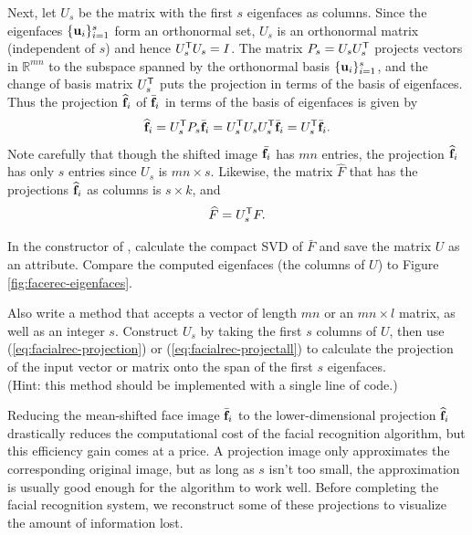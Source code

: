 Next, let $U_s$ be the matrix with the first $s$ eigenfaces as columns.
Since the eigenfaces $\{\mathbf{u}_i\}_{i=1}^s$ form an orthonormal set, $U_s$ is an orthonormal matrix (independent of $s$) and hence $U_s^{\mathsf T} U_s = I$.
The matrix $P_s = U_sU_s^{\mathsf T}$ projects vectors in $\mathbb{R}^{mn}$ to the subspace spanned by the orthonormal basis $\{\mathbf{u}_i\}_{i=1}^s$, and the change of basis matrix $U_s^{\mathsf T}$ puts the projection in terms of the basis of eigenfaces.
Thus the projection $\widehat{\mathbf{f}}_i$ of $\bar{\mathbf{f}}_i$ in terms of the basis of eigenfaces is given by
%
\begin{equation}
\widehat{\mathbf{f}}_i = U_s^{\mathsf T} P_s\bar{\mathbf{f}}_i = U_s^{\mathsf T} U_s U_s^{\mathsf T} \bar{\mathbf{f}}_i = U_s^{\mathsf T}\bar{\mathbf{f}}_i.
\label{eq:facialrec-projection}
\end{equation}
%
Note carefully that though the shifted image $\bar{\mathbf{f}_i}$ has $mn$ entries, the projection $\widehat{\mathbf{f}}_i$ has only $s$ entries since $U_s$ is $mn\times s$.
Likewise, the matrix $\widehat{F}$ that has the projections $\widehat{\mathbf{f}}_i$ as columns is $s \times k$, and
\begin{equation}
\widehat{F} = U_s^{\mathsf T} F.
\label{eq:facialrec-projectall}
\end{equation}

\begin{problem} %
In the constructor of , calculate the compact SVD of $\bar{F}$ and save the matrix $U$ as an attribute.
Compare the computed eigenfaces (the columns of $U$) to Figure \ref{fig:facerec-eigenfaces}.

Also write a method that accepts a vector of length $mn$ or an $mn\times l$ matrix, as well as an integer $s$.
Construct $U_s$ by taking the first $s$ columns of $U$, then use (\ref{eq:facialrec-projection}) or (\ref{eq:facialrec-projectall}) to calculate the projection of the input vector or matrix onto the span of the first $s$ eigenfaces.
\\(Hint: this method should be implemented with a single line of code.)
\label{prob:facialrec-project}
\end{problem}

Reducing the mean-shifted face image $\bar{\mathbf{f}}_i$ to the lower-dimensional projection $\widehat{\mathbf{f}}_i$ drastically reduces the computational cost of the facial recognition algorithm, but this efficiency gain comes at a price.
A projection image only approximates the corresponding original image, but as long as $s$ isn't too small, the approximation is usually good enough for the algorithm to work well.
Before completing the facial recognition system, we reconstruct some of these projections to visualize the amount of information lost.

